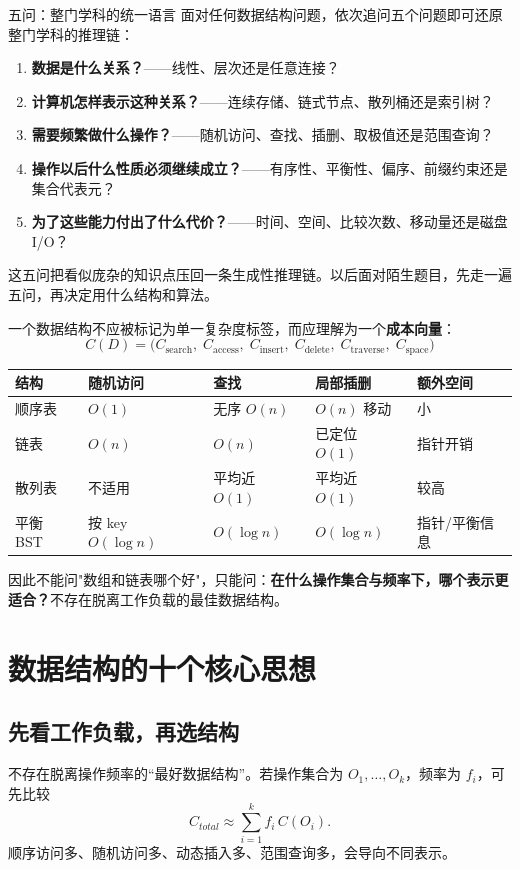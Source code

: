 \documentclass[11pt,a4paper,openany]{ctexbook}
\newcommand{\key}[1]{\textbf{\color{deep}#1}}
\begin{document}
\begin{methodbox}{五问：整门学科的统一语言}
面对任何数据结构问题，依次追问五个问题即可还原整门学科的推理链：
\begin{enumerate}
  \item \key{数据是什么关系？}——线性、层次还是任意连接？
  \item \key{计算机怎样表示这种关系？}——连续存储、链式节点、散列桶还是索引树？
  \item \key{需要频繁做什么操作？}——随机访问、查找、插删、取极值还是范围查询？
  \item \key{操作以后什么性质必须继续成立？}——有序性、平衡性、偏序、前缀约束还是集合代表元？
  \item \key{为了这些能力付出了什么代价？}——时间、空间、比较次数、移动量还是磁盘 I/O？
\end{enumerate}
这五问把看似庞杂的知识点压回一条生成性推理链。以后面对陌生题目，先走一遍五问，再决定用什么结构和算法。
\end{methodbox}

一个数据结构不应被标记为单一复杂度标签，而应理解为一个\key{成本向量}：
\[
\boxed{C(D)=\bigl(C_{\text{search}},\;C_{\text{access}},\;C_{\text{insert}},\;C_{\text{delete}},\;C_{\text{traverse}},\;C_{\text{space}}\bigr)}
\]

\begin{longtable}{p{2.6cm}p{2.3cm}p{2.3cm}p{2.3cm}p{\dimexpr\linewidth-11.27cm\relax}}
\toprule
\textbf{结构} & \textbf{随机访问} & \textbf{查找} & \textbf{局部插删} & \textbf{额外空间}\\
\midrule
顺序表 & $O(1)$ & 无序 $O(n)$ & $O(n)$ 移动 & 小\\
\midrule
链表 & $O(n)$ & $O(n)$ & 已定位 $O(1)$ & 指针开销\\
\midrule
散列表 & 不适用 & 平均近 $O(1)$ & 平均近 $O(1)$ & 较高\\
\midrule
平衡 BST & 按 key $O(\log n)$ & $O(\log n)$ & $O(\log n)$ & 指针/平衡信息\\
\bottomrule
\end{longtable}

因此不能问"数组和链表哪个好"，只能问：\key{在什么操作集合与频率下，哪个表示更适合？}不存在脱离工作负载的最佳数据结构。

\section{数据结构的十个核心思想}

\subsection{先看工作负载，再选结构}
不存在脱离操作频率的“最好数据结构”。若操作集合为 $O_1,\dots,O_k$，频率为 $f_i$，可先比较
\[
\boxed{C_{total}\approx\sum_{i=1}^{k}f_i\,C(O_i)}.
\]
顺序访问多、随机访问多、动态插入多、范围查询多，会导向不同表示。
\end{document}
